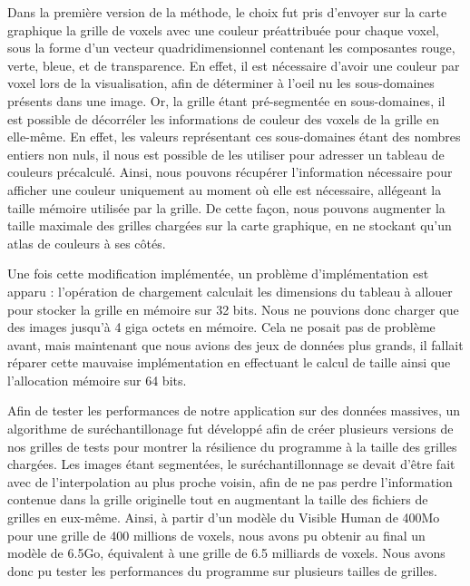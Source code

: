 {{{			Dans la première version de la méthode, le choix fut pris d'envoyer sur la carte graphique la grille de voxels avec une couleur préattribuée pour chaque voxel, sous la forme d'un vecteur quadridimensionnel contenant les composantes rouge, verte, bleue, et de transparence. En effet, il est nécessaire d'avoir une couleur par voxel lors de la visualisation, afin de déterminer à l'oeil nu les sous-domaines présents dans une image. Or, la grille étant pré-segmentée en sous-domaines, il est possible de décorréler les informations de couleur des voxels de la grille en elle-même. En effet, les valeurs représentant ces sous-domaines étant des nombres entiers non nuls, il nous est possible de les utiliser pour adresser un tableau de couleurs précalculé. Ainsi, nous pouvons récupérer l'information nécessaire pour afficher une couleur uniquement au moment où elle est nécessaire, allégeant la taille mémoire utilisée par la grille. De cette façon, nous pouvons augmenter la taille maximale des grilles chargées sur la carte graphique, en ne stockant qu'un atlas de couleurs à ses côtés.

			Une fois cette modification implémentée, un problème d'implémentation est apparu : l'opération de chargement calculait les dimensions du tableau à allouer pour stocker la grille en mémoire sur 32 bits. Nous ne pouvions donc charger que des images jusqu'à 4 giga octets en mémoire. Cela ne posait pas de problème avant, mais maintenant que nous avions des jeux de données plus grands, il fallait réparer cette mauvaise implémentation en effectuant le calcul de taille ainsi que l'allocation mémoire sur 64 bits.

			Afin de tester les performances de notre application sur des données massives, un algorithme de suréchantillonage fut développé afin de créer plusieurs versions de nos grilles de tests pour montrer la résilience du programme à la taille des grilles chargées.
			Les images étant segmentées, le suréchantillonnage se devait d'être fait avec de l'interpolation au plus proche voisin, afin de ne pas perdre l'information contenue dans la grille originelle tout en augmentant la taille des fichiers de grilles en eux-même. Ainsi, à partir d'un modèle du Visible Human de 400Mo pour une grille de 400 millions de voxels, nous avons pu obtenir au final un modèle de 6.5Go, équivalent à une grille de 6.5 milliards de voxels. Nous avons donc pu tester les performances du programme sur plusieurs tailles de grilles.

}}}
